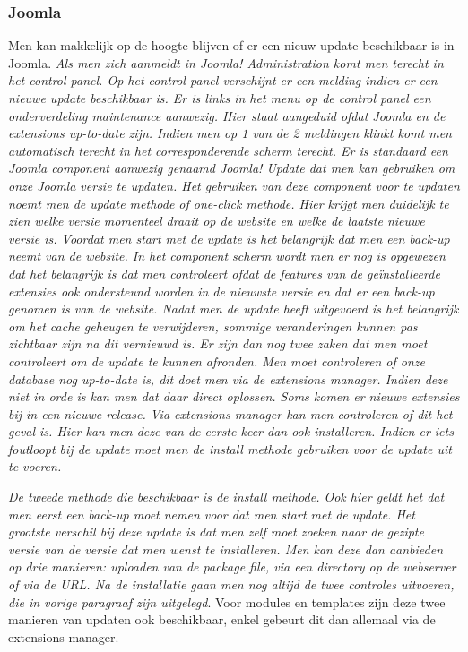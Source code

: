 \subsubsection{Joomla}
Men kan makkelijk op de hoogte blijven of er een nieuw update beschikbaar is in Joomla.\textit{ Als men zich aanmeldt in Joomla! Administration komt men terecht in het control panel. Op het control panel verschijnt er een melding indien er een nieuwe update beschikbaar is. Er is links in het menu op de control panel een onderverdeling maintenance aanwezig. Hier staat aangeduid ofdat Joomla en de extensions up-to-date zijn. Indien men op 1 van de 2 meldingen klinkt komt men automatisch terecht in het corresponderende scherm terecht. Er is standaard een Joomla component aanwezig genaamd Joomla! Update dat men kan gebruiken om onze Joomla versie te updaten. Het gebruiken van deze component voor te updaten noemt men de update methode of one-click methode. Hier krijgt men duidelijk te zien welke versie momenteel draait op de website en welke de laatste nieuwe versie is. Voordat men start met de update is het belangrijk dat men een back-up neemt van de website. In het component scherm wordt men er nog is opgewezen dat het belangrijk is dat men controleert ofdat de features van de geïnstalleerde extensies ook ondersteund worden in de nieuwste versie en dat er een back-up genomen is van de website. Nadat men de update heeft uitgevoerd is het belangrijk om het cache geheugen te verwijderen, sommige veranderingen kunnen pas zichtbaar zijn na dit vernieuwd is. Er zijn dan nog twee zaken dat men moet controleert om de update te kunnen afronden. Men moet controleren of onze database nog up-to-date is, dit doet men via de extensions manager. Indien deze niet in orde is kan men dat daar direct oplossen. Soms komen er nieuwe extensies bij in een nieuwe release. Via extensions manager kan men controleren of dit het geval is. Hier kan men deze van de eerste keer dan ook installeren. Indien er iets foutloopt bij de update moet men de install methode gebruiken voor de update uit te voeren.}\autocite{JoomlaCommunity2019, JoomlaCommunity2019a}

\textit{De tweede methode die beschikbaar is de install methode. Ook hier geldt het dat men eerst een back-up moet nemen voor dat men start met de update. Het grootste verschil bij deze update is dat men zelf moet zoeken naar de gezipte versie van de versie dat men wenst te installeren. Men kan deze dan aanbieden op drie manieren: uploaden van de package file, via een directory op de webserver of via de URL. Na de installatie gaan men nog altijd de twee controles uitvoeren, die in vorige paragraaf zijn uitgelegd}.\autocite{JoomlaCommunity2019b} Voor modules en templates zijn deze twee manieren van updaten ook beschikbaar, enkel gebeurt dit dan allemaal via de extensions manager.

